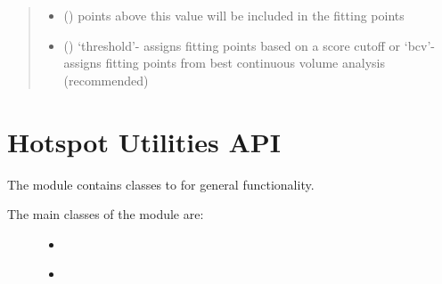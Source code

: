 \documentclass[letterpaper,10pt,english]{sphinxmanual}
\begin{document}
\begin{fulllineitems}
\begin{fulllineitems}
\begin{quote}
\begin{description}
\begin{itemize}
\item {} 
 () \textendash{} points above this value will be included in the fitting points

\item {} 
 () \textendash{} ‘threshold’- assigns fitting points based on a score cutoff or ‘bcv’- assigns fitting points from best continuous volume analysis (recommended)

\end{itemize}

\end{description}\end{quote}

\end{fulllineitems}


\end{fulllineitems}



\chapter{Hotspot Utilities API}
\label{\detokenize{hs_utilities_api:module-hotspots.hs_utilities}}\label{\detokenize{hs_utilities_api:hotspot-utilities-api}}\label{\detokenize{hs_utilities_api::doc}}
The  module contains classes to for
general functionality.
\begin{description}
\item[{The main classes of the  module are:}] \leavevmode\begin{itemize}
\item {} 
{\hyperref[\detokenize{hs_utilities_api:hotspots.hs_utilities.Helper}]{}}

\item {} 
{\hyperref[\detokenize{hs_utilities_api:hotspots.hs_utilities.Figures}]{}}

\end{itemize}

\end{description}
\end{document}

